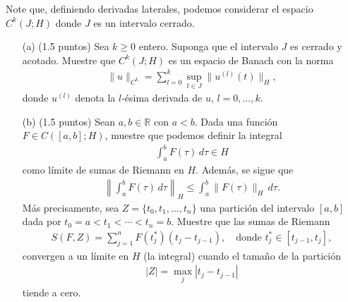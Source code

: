Note que, definiendo derivadas laterales, podemos considerar el espacio $C^k(J;H)$ donde $J$ es un intervalo cerrado.

\begin{enumerate}
  \item[(a)] (1.5 puntos) Sea $k \geq 0$ entero. Suponga que el intervalo $J$ es cerrado y acotado. Muestre que $C^k(J;H)$ es un espacio de Banach con la norma
  \begin{align*}
    \|u\|_{C^k} = \sum_{l=0}^k \sup_{t \in J} \|u^{(l)}(t)\|_H,
  \end{align*}
  donde $u^{(l)}$ denota la $l$-ésima derivada de $u$, $l = 0, \dots, k$.
  
  \item[(b)] (1.5 puntos) Sean $a, b \in \mathbb{R}$ con $a < b$. Dada una función $F \in C([a,b];H)$, muestre que podemos definir la integral
  \begin{align*}
    \int_a^b F(\tau)\, d\tau \in H
  \end{align*}
  como límite de sumas de Riemann en $H$. Además, se sigue que
  \begin{align*}
    \left\| \int_a^b F(\tau)\, d\tau \right\|_H \leq \int_a^b \|F(\tau)\|_H\, d\tau.
  \end{align*}
  Más precisamente, sea $Z = \{t_0, t_1, \dots, t_n\}$ una partición del intervalo $[a,b]$ dada por $t_0 = a < t_1 < \cdots < t_n = b$. Muestre que las sumas de Riemann
  \begin{align*}
    S(F,Z) = \sum_{j=1}^n F(t_j^*)(t_j - t_{j-1}), \quad \text{donde } t_j^* \in [t_{j-1}, t_j],
  \end{align*}
  convergen a un límite en $H$ (la integral) cuando el tamaño de la partición
  \begin{align*}
    |Z| = \max_j |t_j - t_{j-1}|
  \end{align*}
  tiende a cero.


\end{enumerate}
